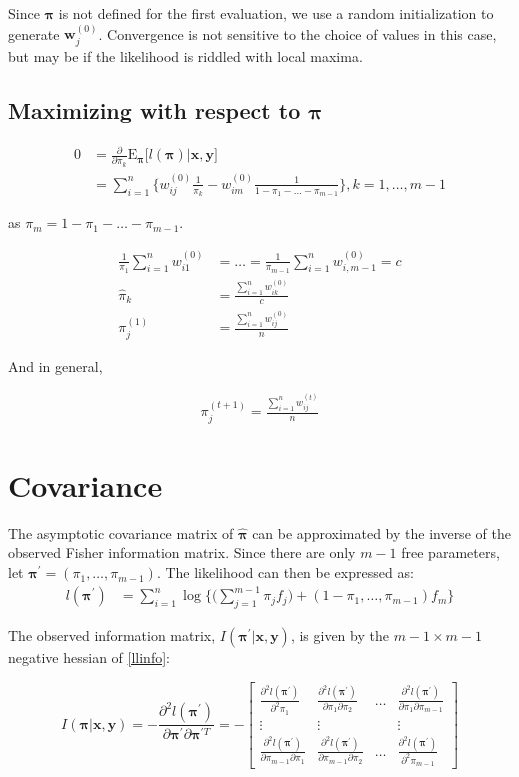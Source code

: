 \documentclass[12pt]{amsart}
\newcommand{\vect}[1]{\boldsymbol{\mathbf{#1}}}
\newcommand{\eqn}[1]{\begin{align*}
#1
\end{align*}}
\newcommand{\eqnl}[2]{\begin{align} \label{#1}
#2
\end{align}}
\newcommand{\Bl}{\Big\{}
\newcommand{\Br}{\Big\}}
\newcommand{\mtx}[4]{
\[
#1 = #2
\left[ {\begin{array}{#3}
 #4
 \end{array} } \right]
\]
}
\newcommand{\vx}{\vect{x}}
\newcommand{\vy}{\vect{y}}
\newcommand{\vp}{\vect{\pi}}
\newcommand{\vph}{\hat{\vect{\pi}}}
\newcommand{\fab}{f_j}
\newcommand{\llp}{l(\vect{\pi})}
\newcommand{\llpp}{l(\vect{\pi^\prime})}
\newcommand{\pims}{1-\pi_1,\ldots,\pi_{m-1}}
\newcommand{\hesslld}[2]{\frac{\partial^2 \llpp}{\partial \pi_{#1} \partial \pi_{#2}}}
\newcommand{\sumn}{\sum^n_{i=1}}
\newcommand{\summo}{\sum^{m-1}_{j=1}}
\begin{document}
Since $\vp$ is not defined for the first evaluation, we use a random initialization to generate $\vect{w}_{j}^{(0)}$. Convergence is not sensitive to the choice of values in this case, but may be if the likelihood is riddled with local maxima.

\subsection{Maximizing with respect to $\vp$}
\eqn{
	0 &= \frac{\partial}{\partial \pi_k} \text{E}_{\vect{\pi}}\Big[\llp \big| \vect{x},\vect{y}\Big]    \\
	& =      \sumn \Bl  w^{(0)}_{ij} \frac{1}{\pi_k} - w^{(0)}_{im} \frac{1}{1-\pi_1-\ldots-\pi_{m-1}}   \Br, k=1,\ldots,m-1
}

as $\pi_m = 1 - \pi_1 - \ldots - \pi_{m-1}$.


\eqn{
	\frac{1}{\pi_1} \sumn w^{(0)}_{i1} &= \ldots = \frac{1}{\pi_{m-1}} \sumn w^{(0)}_{i,m-1} = c	\\
	\hat{\pi}_k &= \frac{\sumn w^{(0)}_{ik}}{c}		\\
	\pi^{(1)}_j &= \frac{\sumn w^{(0)}_{ij}}{n}
}

And in general,


\eqn{
	\pi^{(t+1)}_j = \frac{\sumn w^{(t)}_{ij}}{n}
}




















\clearpage
\section{Covariance}
The asymptotic covariance matrix of $\vph$ can be approximated by the inverse of the observed Fisher information matrix. Since there are only $m-1$ free parameters, let $\vp^\prime=(\pi_1,\ldots,\pi_{m-1})$. The likelihood can then be expressed as:
\eqnl{llinfo}{
	\llpp &= \sumn \log \Bigg\{ \Big( \summo \pi_j \fab \Big) + (\pims)f_m \Bigg\}	
}

The observed information matrix, $I(\vp^\prime|\vx,\vy)$, is given by the $m-1\times m-1$ negative hessian of \eqref{llinfo}:

\mtx{I(\vp|\vx,\vy)=-\frac{\partial^2 \llpp}{\partial \vp^\prime \partial \vp^{\prime T}}}{-}{cccc}{
	\frac{\partial^2 \llpp}{\partial^2 \pi_1} & \hesslld{1}{2} & \ldots & \hesslld{1}{m-1}	\\
	\vdots & \vdots & & \vdots	\\
	\hesslld{m-1}{1} & \hesslld{m-1}{2} & \ldots & \frac{\partial^2 \llpp}{\partial^2 \pi_{m-1}}
}
\end{document}
